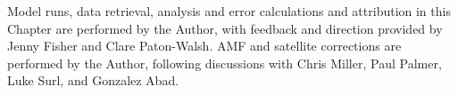 \documentclass[acp, manuscript]{copernicus}
\begin{document}

\appendixfigures  %

\appendixtables   %







\begin{acknowledgements}
  Model runs, data retrieval, analysis and error calculations and attribution in this Chapter are performed by the Author, with feedback and direction provided by Jenny Fisher and Clare Paton-Walsh.
  AMF and satellite corrections are performed by the Author, following discussions with Chris Miller, Paul Palmer, Luke Surl, and Gonzalez Abad.
\end{acknowledgements}








\end{document}
